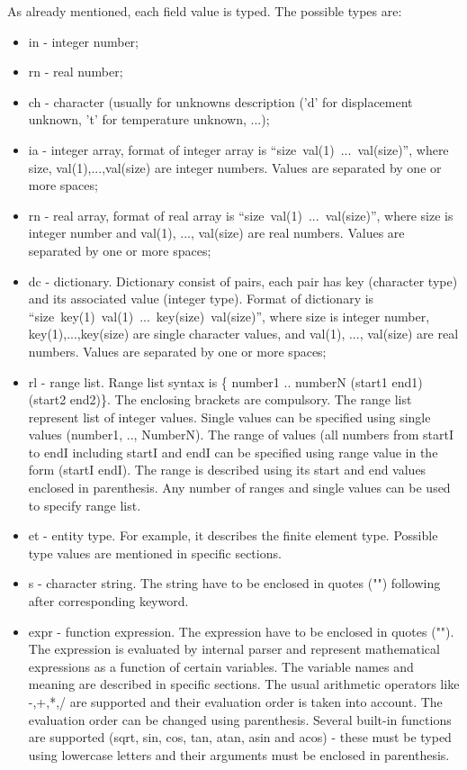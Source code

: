 \documentclass[a4paper]{article}
\begin{document}
As already mentioned, each field value is typed. The possible types are:
\begin{itemize}
\item in - integer number;
\item rn - real number;
\item ch - character (usually for unknowns description ('d' for
displacement unknown, 't' for temperature unknown, ...);
\item ia - integer array, format of integer array is
``size~val(1)~...~val(size)'', where size, val(1),...,val(size) are
integer numbers. Values are separated by one or more spaces;
\item rn - real array, format of real array is
``size~val(1)~...~val(size)'', where size is integer number and val(1),
..., val(size) are real numbers. Values are separated by one or more spaces;
\item dc - dictionary. Dictionary consist of pairs, each pair has key
(character type) and its associated value (integer type).
Format of dictionary is
``size~key(1)~val(1)~...~key(size)~val(size)'', where size is integer
number, key(1),...,key(size) are single character values, and val(1),
..., val(size) are real numbers. Values are separated by one or more spaces;
\item rl - range list. Range list syntax is \{ number1 .. numberN (start1
end1) (start2 end2)\}. The enclosing brackets are compulsory. The range
list represent list of integer values. Single values can be specified
using single values (number1, .., NumberN). The range of values
(all numbers from startI to endI including startI and endI can be
specified using range value in the form (startI endI). The range is
described using its start and end values enclosed in parenthesis.
Any number of ranges and single values can be used to specify range list.
\item et - entity type. For  example, it describes the finite element
type. Possible type values are mentioned in specific sections.
\item s - character string. The string have to be enclosed
in quotes ("") following after corresponding keyword.
\item expr - function expression. The expression have to be enclosed
in quotes (""). The expression is evaluated by internal parser and 
represent mathematical expressions as a function of certain variables.
The variable names and meaning are described in specific sections. 
The usual arithmetic operators like -,+,*,/ are supported and their
evaluation order is taken into account. The evaluation order can be
changed using parenthesis. Several built-in functions are supported
(sqrt, sin, cos, tan, atan, asin and acos) - these must be typed using 
lowercase letters and their arguments must be enclosed in parenthesis.
\end{itemize}
\end{document}
